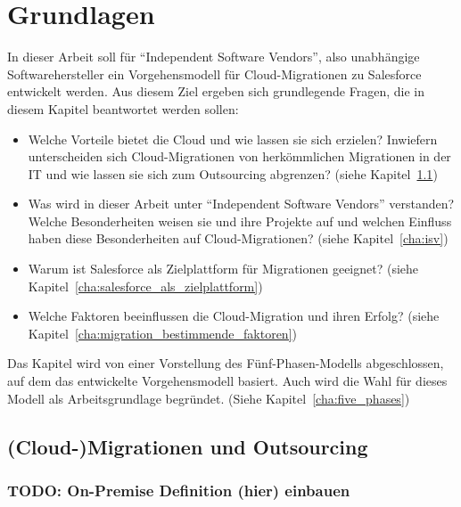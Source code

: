 \section{Grundlagen}



In dieser Arbeit soll für "`Independent Software Vendors"', also unabhängige 
Softwarehersteller ein Vorgehensmodell für Cloud-Migrationen zu Salesforce 
entwickelt werden. Aus diesem Ziel ergeben sich grundlegende Fragen, die in 
diesem Kapitel beantwortet werden sollen:
\begin{itemize}
	\item Welche Vorteile bietet die Cloud und wie lassen sie sich 
erzielen? Inwiefern unterscheiden sich Cloud-Migrationen von herkömmlichen 
Migrationen in der IT und wie lassen sie sich zum Outsourcing abgrenzen? (siehe 
Kapitel~\ref{cha:definition_cloud-migration})
	\item Was wird in dieser Arbeit unter "`Independent Software Vendors"' 
verstanden? Welche Besonderheiten weisen sie und ihre Projekte auf und welchen 
Einfluss haben diese Besonderheiten auf Cloud-Migrationen? (siehe 
Kapitel~\ref{cha:isv})
	\item Warum ist Salesforce als Zielplattform für Migrationen 
geeignet? (siehe Kapitel~\ref{cha:salesforce_als_zielplattform})
	\item Welche Faktoren beeinflussen die Cloud-Migration und ihren 
Erfolg? (siehe Kapitel~\ref{cha:migration_bestimmende_faktoren})
\end{itemize}
Das Kapitel wird von einer Vorstellung des Fünf-Phasen-Modells abgeschlossen, 
auf dem das entwickelte Vorgehensmodell basiert. Auch wird die Wahl für dieses 
Modell als Arbeitsgrundlage begründet. (Siehe Kapitel~\ref{cha:five_phases})

\subsection{(Cloud-)Migrationen und Outsourcing}
\label{cha:definition_cloud-migration}

\subsubsection{TODO: On-Premise Definition (hier) einbauen}

